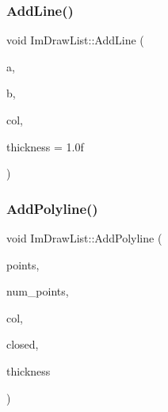 \hypertarget{struct_im_draw_list_a6db76ca2506dc86ad4d602fdcd2e2ea8}{}\label{struct_im_draw_list_a6db76ca2506dc86ad4d602fdcd2e2ea8} 
\subsubsection{\texorpdfstring{Add\+Line()}{AddLine()}}
{\footnotesize\ttfamily void Im\+Draw\+List\+::\+Add\+Line (\begin{DoxyParamCaption}\item[{const \hyperlink{struct_im_vec2}{Im\+Vec2} \&}]{a,  }\item[{const \hyperlink{struct_im_vec2}{Im\+Vec2} \&}]{b,  }\item[{Im\+U32}]{col,  }\item[{float}]{thickness = {\ttfamily 1.0f} }\end{DoxyParamCaption})}

\hypertarget{struct_im_draw_list_aad1fcecdd4602fe6bb253fdee8ad5378}{}\label{struct_im_draw_list_aad1fcecdd4602fe6bb253fdee8ad5378} 
\subsubsection{\texorpdfstring{Add\+Polyline()}{AddPolyline()}}
{\footnotesize\ttfamily void Im\+Draw\+List\+::\+Add\+Polyline (\begin{DoxyParamCaption}\item[{const \hyperlink{struct_im_vec2}{Im\+Vec2} $\ast$}]{points,  }\item[{const int}]{num\+\_\+points,  }\item[{Im\+U32}]{col,  }\item[{bool}]{closed,  }\item[{float}]{thickness }\end{DoxyParamCaption})}

\hypertarget{struct_im_draw_list_ac3fd62862000b2a7a4e7f61da0a4e3fd}{}\label{struct_im_draw_list_ac3fd62862000b2a7a4e7f61da0a4e3fd} 
